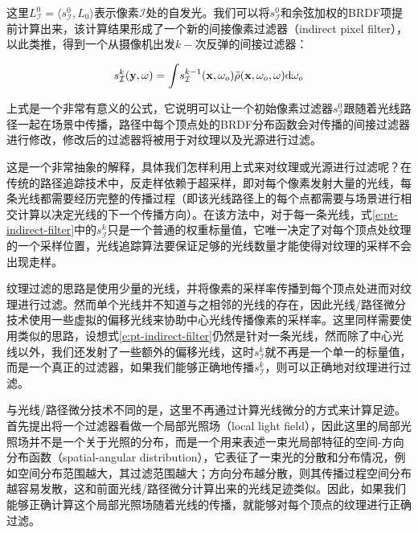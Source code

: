 \noindent 这里$L^{0}_{\mathcal{I}}=\langle s^{0}_{\mathcal{I}},L_0\rangle$表示像素$\mathcal{I}$处的自发光。我们可以将$s^{0}_{\mathcal{I}}$和余弦加权的BRDF项提前计算出来，该计算结果形成了一个新的间接像素过滤器（indirect pixel filter），以此类推，得到一个从摄像机出发$k-$次反弹的间接过滤器：

\begin{equation}\label{e:pt-indirect-filter}
	s^{k}_{\mathcal{I}}(\mathbf{y},\omega)={\rm \int} s^{k-1}_{\mathcal{I}}(\mathbf{x},\omega_o)\tilde{\rho}(\mathbf{x},\omega_o,\omega){\rm d}\omega_o
\end{equation}

上式是一个非常有意义的公式，它说明可以让一个初始像素过滤器$s^{0}_{\mathcal{I}}$跟随着光线路径一起在场景中传播，路径中每个顶点处的BRDF分布函数会对传播的间接过滤器进行修改，修改后的过滤器将被用于对纹理以及光源进行过滤。

这是一个非常抽象的解释，具体我们怎样利用上式来对纹理或光源进行过滤呢？在传统的路径追踪技术中，反走样依赖于超采样，即对每个像素发射大量的光线，每条光线都需要经历完整的传播过程（即该光线路径上的每个点都需要与场景进行相交计算以决定光线的下一个传播方向）。在该方法中，对于每一条光线，式\ref{e:pt-indirect-filter}中的$s^{k}_{\mathcal{I}}$只是一个普通的权重标量值，它唯一决定了对每个顶点处纹理的一个采样位置，光线追踪算法要保证足够的光线数量才能使得对纹理的采样不会出现走样。

纹理过滤的思路是使用少量的光线，并将像素的采样率传播到每个顶点处进而对纹理进行过滤。然而单个光线并不知道与之相邻的光线的存在，因此光线/路径微分技术使用一些虚拟的偏移光线来协助中心光线传播像素的采样率。这里同样需要使用类似的思路，设想式\ref{e:pt-indirect-filter}仍然是针对一条光线，然而除了中心光线以外，我们还发射了一些额外的偏移光线，这时$s^{k}_{\mathcal{I}}$就不再是一个单一的标量值，而是一个真正的过滤器，如果我们能够正确地传播$s^{k}_{\mathcal{I}}$，则可以正确地对纹理进行过滤。

与光线/路径微分技术不同的是，这里不再通过计算光线微分的方式来计算足迹。\cite{a:AFrequencyAnalysisofLightTransport}首先提出将一个过滤器看做一个局部光照场（local light field），因此这里的局部光照场并不是一个关于光照的分布，而是一个用来表述一束光局部特征的空间-方向分布函数（spatial-angular distribution），它表征了一束光的分散和分布情况，例如空间分布范围越大，其过滤范围越大；方向分布越分散，则其传播过程空间分布越容易发散，这和前面光线/路径微分计算出来的光线足迹类似。因此，如果我们能够正确计算这个局部光照场随着光线的传播，就能够对每个顶点的纹理进行正确过滤。

